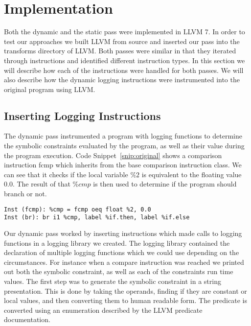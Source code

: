 
\section{Implementation}

Both the dynamic and the static pass were implemented in LLVM 7. In order to test our approaches we built LLVM from source and inserted our pass into the transforms directory of LLVM. Both passes were similar in that they iterated through instructions and identified different instruction types. In this section we will describe how each of the instructions were handled for both passes. We will also describe how the dynamic logging instructions were instrumented into the original program using LLVM.

\subsection{Inserting Logging Instructions}

The dynamic pass instrumented a program with logging functions to determine the symbolic constraints evaluated by the program, as well as their value during the program execution. Code Snippet~\ref{snip:original} shows a comparison instruction fcmp which inherits from the base comparison instruction class. We can see that it checks if the local variable $\%2$ is equivalent to the floating value $0.0$. The result of that $\%cmp$ is then used to determine if the program should branch or not.

\vspace{-0.6cm}

\begin{lstlisting}[caption={Original Branching Code}, label=snip:original]
Inst (fcmp): %cmp = fcmp oeq float %2, 0.0
Inst (br): br i1 %cmp, label %if.then, label %if.else
\end{lstlisting}


Our dynamic pass worked by inserting instructions which made calls to logging functions in a logging library we created. The logging library contained the declaration of multiple logging functions which we could use depending on the circumstances. For instance when a compare instruction was reached we printed out both the symbolic constraint, as well as each of the constraints run time values. The first step was to generate the symbolic constraint in a string presentation. This is done by taking the operands, finding if they are constant or local values, and then converting them to human readable form. The predicate is converted using an enumeration described by the LLVM predicate documentation.

